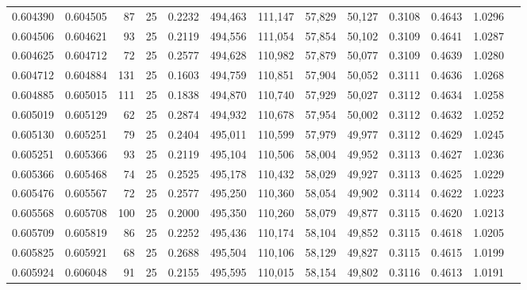 \begin{tabular}{rrrrrrrrrrrrr}
0.604390 & 0.604505 &    87 &  25 &                                     0.2232 & 494,463 & 111,147 &  57,829 &  50,127 & 0.3108 & 0.4643 & 1.0296 \\
0.604506 & 0.604621 &    93 &  25 &                                     0.2119 & 494,556 & 111,054 &  57,854 &  50,102 & 0.3109 & 0.4641 & 1.0287 \\
0.604625 & 0.604712 &    72 &  25 &                                     0.2577 & 494,628 & 110,982 &  57,879 &  50,077 & 0.3109 & 0.4639 & 1.0280 \\
0.604712 & 0.604884 &   131 &  25 &                                     0.1603 & 494,759 & 110,851 &  57,904 &  50,052 & 0.3111 & 0.4636 & 1.0268 \\
0.604885 & 0.605015 &   111 &  25 &                                     0.1838 & 494,870 & 110,740 &  57,929 &  50,027 & 0.3112 & 0.4634 & 1.0258 \\
0.605019 & 0.605129 &    62 &  25 &                                     0.2874 & 494,932 & 110,678 &  57,954 &  50,002 & 0.3112 & 0.4632 & 1.0252 \\
0.605130 & 0.605251 &    79 &  25 &                                     0.2404 & 495,011 & 110,599 &  57,979 &  49,977 & 0.3112 & 0.4629 & 1.0245 \\
0.605251 & 0.605366 &    93 &  25 &                                     0.2119 & 495,104 & 110,506 &  58,004 &  49,952 & 0.3113 & 0.4627 & 1.0236 \\
0.605366 & 0.605468 &    74 &  25 &                                     0.2525 & 495,178 & 110,432 &  58,029 &  49,927 & 0.3113 & 0.4625 & 1.0229 \\
0.605476 & 0.605567 &    72 &  25 &                                     0.2577 & 495,250 & 110,360 &  58,054 &  49,902 & 0.3114 & 0.4622 & 1.0223 \\
0.605568 & 0.605708 &   100 &  25 &                                     0.2000 & 495,350 & 110,260 &  58,079 &  49,877 & 0.3115 & 0.4620 & 1.0213 \\
0.605709 & 0.605819 &    86 &  25 &                                     0.2252 & 495,436 & 110,174 &  58,104 &  49,852 & 0.3115 & 0.4618 & 1.0205 \\
0.605825 & 0.605921 &    68 &  25 &                                     0.2688 & 495,504 & 110,106 &  58,129 &  49,827 & 0.3115 & 0.4615 & 1.0199 \\
0.605924 & 0.606048 &    91 &  25 &                                     0.2155 & 495,595 & 110,015 &  58,154 &  49,802 & 0.3116 & 0.4613 & 1.0191 \\

\end{tabular}
